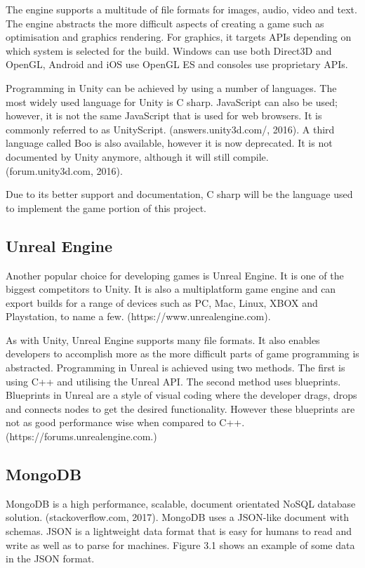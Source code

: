 \documentclass[12pt]{article}
\begin{document}
The engine supports a multitude of file formats for images, audio, video and text. The engine abstracts the more difficult aspects of creating a game such as optimisation and graphics rendering. For graphics, it targets APIs depending on which system is selected for the build. Windows can use both Direct3D and OpenGL, Android and iOS use OpenGL ES and consoles use proprietary APIs.

Programming in Unity can be achieved by using a number of languages. The most widely used language for Unity is C sharp. JavaScript can also be used; however, it is not the same JavaScript that is used for web browsers. It is commonly referred to as UnityScript. (answers.unity3d.com/, 2016). A third language called Boo is also available, however it is now deprecated. It is not documented by Unity anymore, although it will still compile. (forum.unity3d.com, 2016).

Due to its better support and documentation, C sharp will be the language used to implement the game portion of this project.

{\centering \subsection{Unreal Engine}}
Another popular choice for developing games is Unreal Engine. It is one of the biggest competitors to Unity. It is also a multiplatform game engine and can export builds for a range of devices such as PC, Mac, Linux, XBOX and Playstation, to name a few. (https://www.unrealengine.com).

As with Unity, Unreal Engine supports many file formats. It also enables developers to accomplish more as the more difficult parts of game programming is abstracted. Programming in Unreal is achieved using two methods. The first is using C++ and utilising the Unreal API. The second method uses blueprints. Blueprints in Unreal are a style of visual coding where the developer drags, drops and connects nodes to get the desired functionality. However these blueprints are not as good performance wise when compared to C++. (https://forums.unrealengine.com.) 

{\centering \subsection{MongoDB}}
MongoDB is a high performance, scalable, document orientated NoSQL database solution. (stackoverflow.com, 2017). MongoDB uses a JSON-like document with schemas. JSON is a lightweight data format that is easy for humans to read and write as well as to parse for machines. Figure 3.1 shows an example of some data in the JSON format.
\end{document}
